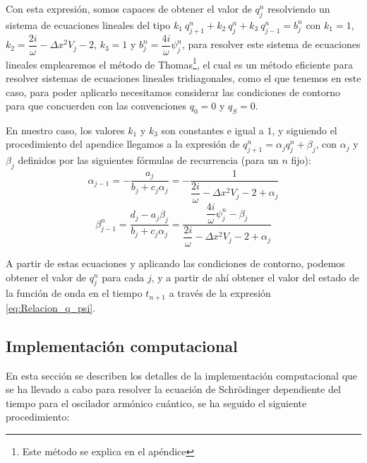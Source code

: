 \documentclass[10pt,onecolumn]{article}
\begin{document}
Con esta expresión, somos capaces de obtener el valor de $q^n_j$ resolviendo un sistema de ecuaciones lineales del tipo $k_1\ q_{j+1}^{n} + k_2\ q_{j}^{n} + k_3\ q_{j-1}^{n} = b_j^n$ con $k_1 = 1$, $k_2 = \dfrac{2i}{\omega} -\Delta x^2 V_j - 2$, $k_3 = 1$ y $b_j^n = \dfrac{4i}{\omega}\psi^n_j$, para resolver este sistema de ecuaciones lineales emplearemos el método de Thomas\footnote{Este método se explica en el apéndice}, el cual es un método eficiente para resolver sistemas de ecuaciones lineales tridiagonales, como el que tenemos en este caso, para poder aplicarlo necesitamos considerar las condiciones de contorno para que concuerden con las convenciones $q_0 = 0$ y $q_S = 0$.

En nuestro caso, los valores $k_1$ y $k_3$ son constantes e igual a $1$, y siguiendo el procedimiento del apendice llegamos a la expresión de $q^n_{j+1} = \alpha_j q^n_j + \beta_j$, con $\alpha_j$ y $\beta_j$ definidos por las siguientes fórmulas de recurrencia (para un $n$ fijo):
\begin{equation}
    \alpha_{j-1} = -\dfrac{a_j}{b_j + c_j \alpha_j} = -\dfrac{1}{\dfrac{2i}{\omega} -\Delta x^2 V_j - 2 + \alpha_j}
\end{equation}
\begin{equation}        
    \beta_{j-1}^n = \dfrac{d_j - a_j \beta_{j}}{b_j + c_j \alpha_j} = \dfrac{\dfrac{4i}{\omega}\psi^n_j - \beta_{j}}{\dfrac{2i}{\omega} -\Delta x^2 V_j - 2 + \alpha_j}
\end{equation}

A partir de estas ecuaciones y aplicando las condiciones de contorno, podemos obtener el valor de $q^n_j$ para cada $j$, y a partir de ahí obtener el valor del estado de la función de onda en el tiempo $t_{n+1}$ a través de la expresión \ref{eq:Relacion_q_psi}.


\subsection{Implementación computacional}
En esta sección se describen los detalles de la implementación computacional que se ha llevado a cabo para resolver la ecuación de Schrödinger dependiente del tiempo para el oscilador armónico cuántico, se ha seguido el siguiente procedimiento:
\end{document}
